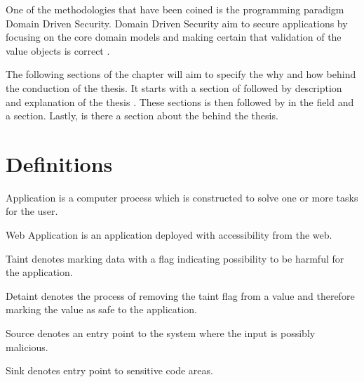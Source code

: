 One of the methodologies that have been coined is the programming paradigm Domain Driven Security. Domain Driven Security aim to secure applications by focusing on the core domain models and making certain that validation of the value objects is correct \parencite{Wilander2009, Johnsson2009}.

The following sections of the chapter will aim to specify the why and how behind the conduction of the thesis. It starts with a section of \textit{} followed by \textit{} description and explanation of the thesis \textit{}. These sections is then followed by \textit{} in the field and a \textit{} section. Lastly, is there a section about the \textit{} behind the thesis.


\section{Definitions}
\label{Definitions}
\begin{definition}{Application}
	is a computer process which is constructed to solve one or more tasks for the user.
	\\
\end{definition}

\begin{definition}{Web Application}
	is an application deployed with accessibility from the web.
	\\
\end{definition}

\begin{definition}{Taint}
	denotes marking data with a flag indicating possibility to be harmful for the application.
	\\
\end{definition}

\begin{definition}{Detaint}
	denotes the process of removing the taint flag from a value and therefore marking the value as safe to the application.
	\\
\end{definition}

\begin{definition}{Source}
	denotes an entry point to the system where the input is possibly malicious.
	\\
\end{definition}

\begin{definition}{Sink}
	denotes entry point to sensitive code areas.
	\\
\end{definition}

